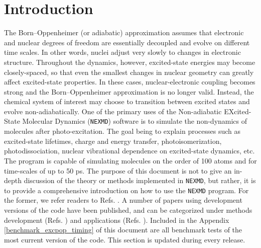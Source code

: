 \documentclass[letterpaper,12pt,titlepage]{article}
\begin{document}
\newpage
\section{Introduction}

The Born--Oppenheimer (or adiabatic) approximation assumes that electronic and nuclear degrees of freedom are essentially decoupled and evolve on different time scales.  In other words, nuclei adjust very slowly to changes in electronic structure.  Throughout the dynamics, however, excited-state energies may become closely-spaced, so that even the smallest changes in nuclear geometry can greatly affect excited-state properties.  In these cases, nuclear-electronic coupling becomes strong and the Born--Oppenheimer approximation is no longer valid.  Instead, the chemical system of interest may choose to transition between excited states and evolve non-adiabatically.  One of the primary uses of the Non-adiabatic EXcited-State Molecular Dynamics (\verb+NEXMD+) software is to simulate the non-dynamics of molecules after photo-excitation.  The goal being to explain processes such as excited-state lifetimes, charge and energy transfer, photoisomerization, photodissociation, nuclear vibrational dependence on excited-state dynamics, etc.  The program is capable of simulating molecules on the order of 100 atoms and for time-scales of up to 50 ps.  The purpose of this document is not to give an in-depth discussion of the theory or methods implemented in \verb+NEXMD+, but rather, it is to provide a comprehensive introduction on how to use the \verb+NEXMD+ program.  For the former, we refer readers to Refs. \cite{nelson2011nonadiabatic, nelson2014nonadiabatic}.  A number of papers using development versions of the code have been published, and can be categorized under methods development (Refs. \cite{nelson2012nonadiabatic,fernandez2012identification,nelson2013nonadiabatic,
nelson2013artifacts,soler2014signature,bjorgaard2015solvent1,bjorgaard2015solvent2,nelson2016nonadiabatic,bjorgaard2016nonequilibrium}) and applications (Refs. \cite{fernandez2009nonadiabatic,fernandez2010unidirectional,soler2012analysis,fernandez2012shishiodoshi,nelson2013conformational,oldani2014modeling,
ondarse2014computational,galindo2015dynamics,bricker2015non,shenai2015internal,greenfield2015photoactive,alfonso2015photoexcited,bjorgaard2015simulations,
franklin2016carbon,ondarse2016ultrafast,nelson2016ultrafast,alfonso2016interference,nelson2017electronic,franklin2017phonon,zheng2017photoinduced}).  Included in the Appendix \ref{benchmark_excpop_timing} of this document are all benchmark tests of the most current version of the code.  This section is updated during every release.
\end{document}
